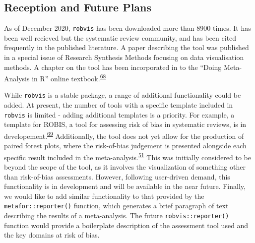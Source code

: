 \documentclass[a4paper, twoside]{templates/ociamthesis}
\newcommand*{\bibtitle}{Bibliography}
\begin{document}
\hypertarget{reception-and-future-plans-1}{%
\subsection{Reception and Future Plans}\label{reception-and-future-plans-1}}

As of December 2020, \texttt{robvis} has been downloaded more than 8900 times. It has been well recieved but the systematic review community, and has been cited frequently in the published literature. A paper describing the tool was published in a special issue of Research Synthesis Methods focusing on data visualisation methods. A chapter on the tool has been incorporated in to the ``Doing Meta-Analysis in R'' online textbook.\textsuperscript{\protect\hyperlink{ref-mathias_harrer_2019_2551803}{68}}

While \texttt{robvis} is a stable package, a range of additional functionality could be added. At present, the number of tools with a specific template included in \texttt{robvis} is limited - adding additional templates is a priority. For example, a template for ROBIS, a tool for assessing risk of bias in systematic reviews, is in developement.\textsuperscript{\protect\hyperlink{ref-whiting2016robis}{69}} Additionally, the tool does not yet allow for the production of paired forest plots, where the risk-of-bias judgement is presented alongside each specific result included in the meta-analysis.\textsuperscript{\protect\hyperlink{ref-cochranechpt7}{51}} This was initially considered to be beyond the scope of the tool, as it involves the visualization of something other than risk-of-bias assessments. However, following user-driven demand, this functionality is in development and will be available in the near future. Finally, we would like to add similar functionality to that provided by the \texttt{metafor::reporter()} function, which generates a brief paragraph of text describing the results of a meta-analysis. The future \texttt{robvis::reporter()} function would provide a boilerplate description of the assessment tool used and the key domains at risk of bias.




\setlength{\baselineskip}{0pt} %

{\renewcommand*\MakeUppercase[1]{#1}%
\printbibliography[heading=bibintoc,title={\bibtitle}]}
\end{document}
